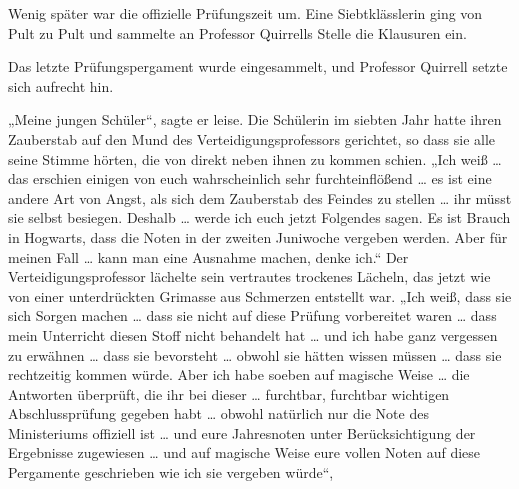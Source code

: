 Wenig später war die offizielle Prüfungszeit um. Eine Siebtklässlerin ging von Pult zu Pult und sammelte an Professor Quirrells Stelle die Klausuren ein.

Das letzte Prüfungspergament wurde eingesammelt, und Professor Quirrell setzte sich aufrecht hin.

„Meine jungen Schüler“, sagte er leise.
Die Schülerin im siebten Jahr hatte ihren Zauberstab auf den Mund des Verteidigungsprofessors gerichtet, so dass sie alle seine Stimme hörten, die von direkt neben ihnen zu kommen schien.
„Ich weiß … das erschien einigen von euch wahrscheinlich sehr furchteinflößend … es ist eine andere Art von Angst, als sich dem Zauberstab des Feindes zu stellen … ihr müsst sie selbst besiegen. Deshalb … werde ich euch jetzt Folgendes sagen. Es ist Brauch in Hogwarts, dass die Noten in der zweiten Juniwoche vergeben werden. Aber für meinen Fall … kann man eine Ausnahme machen, denke ich.“
Der Verteidigungsprofessor lächelte sein vertrautes trockenes Lächeln, das jetzt wie von einer unterdrückten Grimasse aus Schmerzen entstellt war.
„Ich weiß, dass sie sich Sorgen machen … dass sie nicht auf diese Prüfung vorbereitet waren … dass mein Unterricht diesen Stoff nicht behandelt hat … und ich habe ganz vergessen zu erwähnen … dass sie bevorsteht … obwohl sie hätten wissen müssen … dass sie rechtzeitig kommen würde. Aber ich habe soeben auf magische Weise … die Antworten überprüft, die ihr bei dieser … furchtbar, furchtbar wichtigen Abschlussprüfung gegeben habt … obwohl natürlich nur die Note des Ministeriums offiziell ist … und eure Jahresnoten unter Berücksichtigung der Ergebnisse zugewiesen … und auf magische Weise eure vollen Noten auf diese Pergamente geschrieben wie ich sie vergeben würde“,
